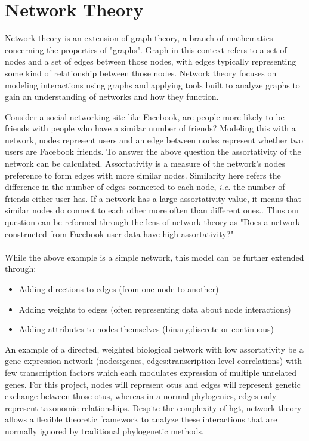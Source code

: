 \documentclass[12pt,letter]{article}
\begin{document}
\section{Network Theory}
Network theory is an extension of graph theory, a branch of mathematics concerning the properties of "graphs".
Graph in this context refers to a set of nodes and a set of edges between those nodes, with edges typically representing some kind of relationship between those nodes\citep{netgen}.
Network theory focuses on modeling interactions using graphs and applying tools built to analyze graphs to gain an understanding of networks and how they function.\par
Consider a social networking site like Facebook, are people more likely to be friends with people who have a similar number of friends?
Modeling this with a network, nodes represent users and an edge between nodes represent whether two users are Facebook friends.
To answer the above question the assortativity of the network can be calculated.
Assortativity is a measure of the network's nodes preference to form edges with more similar nodes\citep{netgen}.
Similarity here refers the difference in the number of edges connected to each node, \textit{i.e.} the number of friends either user has.
If a network has a large assortativity value, it means that similar nodes do connect to each other more often than different ones.\citep{netgen}.
Thus our question can be reformed through the lens of network theory as "Does a network constructed from Facebook user data have high assortativity?"\\\\
While the above example is a simple network, this model can be further extended through:
\begin{itemize}
    \item Adding directions to edges (from one node to another)
    \item Adding weights to edges (often representing data about node interactions)
    \item Adding attributes to nodes themselves (binary,discrete or continuous)
\end{itemize}
An example of a directed, weighted biological network with low assortativity be a gene expression network (nodes:genes, edges:transcription level correlations) with few transcription factors which each modulates expression of multiple unrelated genes.
For this project, nodes will represent \ac{otu}s and edges will represent genetic exchange between those \ac{otu}s, whereas in a normal phylogenies, edges only represent taxonomic relationships.
Despite the complexity of \ac{hgt}, network theory allows a flexible theoretic framework to analyze these interactions that are normally ignored by traditional phylogenetic methods.
\end{document}

